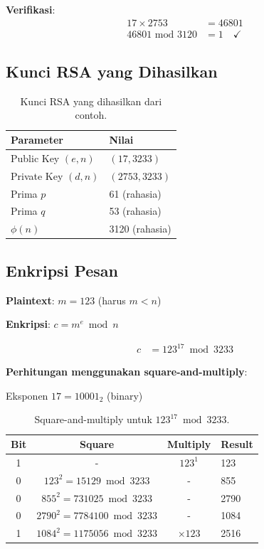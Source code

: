 \textbf{Verifikasi}:
\begin{align*}
17 \times 2753 &= 46801 \\
46801 \text{ mod } 3120 &= 1 \quad \checkmark
\end{align*}

\subsection{Kunci RSA yang Dihasilkan}

\begin{table}[htbp]
  \centering
  \begin{tabular}{ll}
    \toprule
    \textbf{Parameter} & \textbf{Nilai} \\
    \midrule
    Public Key $(e, n)$ & $(17, 3233)$ \\
    Private Key $(d, n)$ & $(2753, 3233)$ \\
    \midrule
    Prima $p$ & 61 (rahasia) \\
    Prima $q$ & 53 (rahasia) \\
    $\phi(n)$ & 3120 (rahasia) \\
    \bottomrule
  \end{tabular}
  \caption{Kunci RSA yang dihasilkan dari contoh.}
\end{table}

\subsection{Enkripsi Pesan}

\textbf{Plaintext}: $m = 123$ (harus $m < n$)

\textbf{Enkripsi}: $c = m^e \bmod n$

\begin{align*}
c &= 123^{17} \bmod 3233
\end{align*}

\textbf{Perhitungan menggunakan square-and-multiply}:

Eksponen $17 = 10001_2$ (binary)

\begin{table}[htbp]
  \centering
  \small
  \begin{tabular}{cccl}
    \toprule
    \textbf{Bit} & \textbf{Square} & \textbf{Multiply} & \textbf{Result} \\
    \midrule
    1 & - & $123^1$ & 123 \\
    0 & $123^2 = 15129 \bmod 3233$ & - & 855 \\
    0 & $855^2 = 731025 \bmod 3233$ & - & 2790 \\
    0 & $2790^2 = 7784100 \bmod 3233$ & - & 1084 \\
    1 & $1084^2 = 1175056 \bmod 3233$ & $\times 123$ & 2516 \\
    \bottomrule
  \end{tabular}
  \caption{Square-and-multiply untuk $123^{17} \bmod 3233$.}
\end{table}

